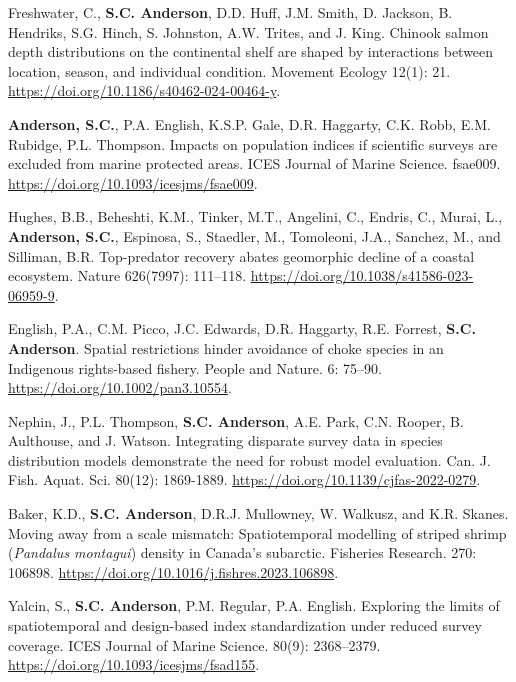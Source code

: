 \begin{description}
\tightlist
\item[2024]
Freshwater, C., \textbf{S.C. Anderson}, D.D. Huff, J.M. Smith, D.
Jackson, B. Hendriks, S.G. Hinch, S. Johnston, A.W. Trites, and J. King.
Chinook salmon depth distributions on the continental shelf are shaped
by interactions between location, season, and individual condition.
Movement Ecology 12(1): 21.
\url{https://doi.org/10.1186/s40462-024-00464-y}.
\item[2024]
\textbf{Anderson, S.C.}, P.A. English, K.S.P. Gale, D.R. Haggarty, C.K.
Robb, E.M. Rubidge, P.L. Thompson. Impacts on population indices if
scientific surveys are excluded from marine protected areas. ICES
Journal of Marine Science. fsae009.
\url{https://doi.org/10.1093/icesjms/fsae009}.
\item[2024]
Hughes, B.B., Beheshti, K.M., Tinker, M.T., Angelini, C., Endris, C.,
Murai, L., \textbf{Anderson, S.C.}, Espinosa, S., Staedler, M.,
Tomoleoni, J.A., Sanchez, M., and Silliman, B.R. Top-predator recovery
abates geomorphic decline of a coastal ecosystem. Nature 626(7997):
111--118. \url{https://doi.org/10.1038/s41586-023-06959-9}.
\item[2024]
English, P.A., C.M. Picco, J.C. Edwards, D.R. Haggarty, R.E. Forrest,
\textbf{S.C. Anderson}. Spatial restrictions hinder avoidance of choke
species in an Indigenous rights-based fishery. People and Nature. 6:
75--90. \url{https://doi.org/10.1002/pan3.10554}.
\item[2023]
Nephin, J., P.L. Thompson, \textbf{S.C. Anderson}, A.E. Park, C.N.
Rooper, B. Aulthouse, and J. Watson. Integrating disparate survey data
in species distribution models demonstrate the need for robust model
evaluation. Can. J. Fish. Aquat. Sci. 80(12): 1869-1889.
\url{https://doi.org/10.1139/cjfas-2022-0279}.
\item[2024]
Baker, K.D., \textbf{S.C. Anderson}, D.R.J. Mullowney, W. Walkusz, and
K.R. Skanes. Moving away from a scale mismatch: Spatiotemporal modelling
of striped shrimp (\emph{Pandalus montagui}) density in Canada's
subarctic. Fisheries Research. 270: 106898.
\url{https://doi.org/10.1016/j.fishres.2023.106898}.
\item[2023]
Yalcin, S., \textbf{S.C. Anderson}, P.M. Regular, P.A. English.
Exploring the limits of spatiotemporal and design-based index
standardization under reduced survey coverage. ICES Journal of Marine
Science. 80(9): 2368--2379.
\url{https://doi.org/10.1093/icesjms/fsad155}.
\item[2023]

\end{description}
